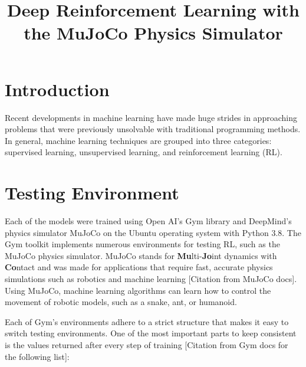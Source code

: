 \documentclass[conference]{IEEEtran}
\begin{document}
\title{Deep Reinforcement Learning with the MuJoCo Physics Simulator}

\author{
    \and
}
\maketitle

\begin{abstract}
    \blindtext
\end{abstract}

\section{Introduction}

Recent developments in machine learning have made huge strides in approaching problems that were previously unsolvable
with traditional programming methods. In general, machine learning techniques are grouped into three categories:
supervised learning, unsupervised learning, and reinforcement learning (RL). \cite{rl_application}

\blindtext
\blinditemize[4]

\blindtext

\section{Testing Environment}

Each of the models were trained using Open AI's Gym library and DeepMind's physics simulator MuJoCo on the Ubuntu
operating system with Python 3.8. The Gym toolkit implements numerous environments for testing RL, such as the MuJoCo
physics simulator. MuJoCo stands for {\bf Mu}lti-{\bf Jo}int dynamics with {\bf Co}ntact and was made for applications
that require fast, accurate physics simulations such as robotics and machine learning [Citation from MuJoCo docs]. Using
MuJoCo, machine learning algorithms can learn how to control the movement of robotic models, such as a snake, ant, or
humanoid.

Each of Gym's environments adhere to a strict structure that makes it easy to switch testing environments. One of the
most important parts to keep consistent is the values returned after every step of training [Citation from Gym docs for the following list]:
\end{document}
